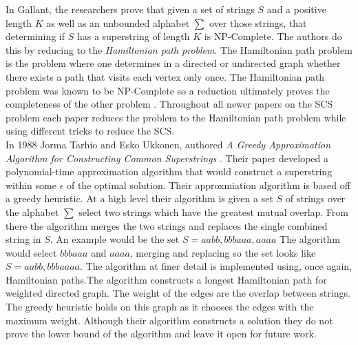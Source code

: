 \documentclass[letterpaper,11pt,titlepage]{article}
\begin{document}
In Gallant, the researchers prove that given a set of strings $S$ and a positive length $K$ as well as an unbounded alphabet $\sum$ over those strings, that determining if $S$ has a superstring of length $K$ is NP-Complete. The authors do this by reducing to the \textit{Hamiltonian  path problem}. The Hamiltonian path problem is the problem where one determines in a directed or undirected graph whether there exists a path that visits each vertex only once. The Hamiltonian path problem was known to be NP-Complete so a reduction ultimately proves the completeness of the other problem \cite{michael1979computers}. Throughout all newer papers on the SCS problem each paper reduces the problem to the Hamiltonian path problem while using different tricks to reduce the SCS.\\


In 1988 Jorma Tarhio and Esko Ukkonen, authored \textit{A Greedy Approximation Algorithm for Constructing Common Superstrings} \cite{tarhio1988greedy}. Their paper developed a polynomial-time approximation algorithm that would construct a superstring within some $\epsilon$ of the optimal solution. Their approxmiation algorithm is based off a greedy heuristic. At a high level their algorithm is given a set $S$ of strings over the alphabet $\sum$ select two strings which have the greatest mutual overlap. From there the algorithm merges the two strings and replaces the single combined string in $S$. An example would be the set $S = {aabb, bbbaaa, aaaa}$ The algorithm would select $bbbaaa$ and $aaaa$, merging and replacing so the set looks like $S = { aabb, bbbaaaa }$. The algorithm at finer detail is implemented using, once again, Hamiltonian paths.The algorithm constructs a longest Hamiltonian path for weighted directed graph. The weight of the edges are the overlap between strings. The greedy heuristic holds on this graph as it chooses the edges with the maximum weight. Although their algorithm constructs a solution they do not prove the lower bound of the algorithm and leave it open for future work. \\
\end{document}
